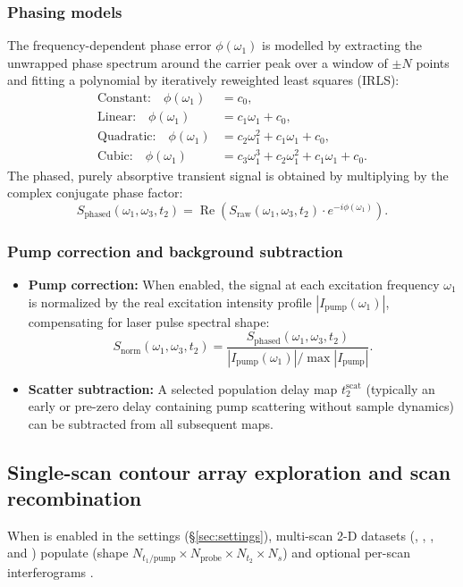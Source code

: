 \subsubsection{Phasing models}
The frequency-dependent phase error $\phi(\omega_1)$ is modelled by extracting the unwrapped phase spectrum around the carrier peak over a window of $\pm N$ points and fitting a polynomial by iteratively reweighted least squares (IRLS):
\begin{align}
  \text{Constant:}  \quad \phi(\omega_1) &= c_0, \\
  \text{Linear:}    \quad \phi(\omega_1) &= c_1 \omega_1 + c_0, \\
  \text{Quadratic:} \quad \phi(\omega_1) &= c_2 \omega_1^2 + c_1 \omega_1 + c_0, \\
  \text{Cubic:}     \quad \phi(\omega_1) &= c_3 \omega_1^3 + c_2 \omega_1^2 + c_1 \omega_1 + c_0.
\end{align}
The phased, purely absorptive transient signal is obtained by multiplying by the complex conjugate phase factor:
\begin{equation}
  S_{\text{phased}}(\omega_1, \omega_3, t_2) = \operatorname{Re}\left( S_{\text{raw}}(\omega_1, \omega_3, t_2) \cdot e^{-i \phi(\omega_1)} \right).
\end{equation}

\subsubsection{Pump correction and background subtraction}
\begin{itemize}
  \item \textbf{Pump correction:} When enabled, the signal at each excitation frequency $\omega_1$ is normalized by the real excitation intensity profile $|I_{\text{pump}}(\omega_1)|$, compensating for laser pulse spectral shape:
    \begin{equation}
      S_{\text{norm}}(\omega_1, \omega_3, t_2) = \frac{S_{\text{phased}}(\omega_1, \omega_3, t_2)}{|I_{\text{pump}}(\omega_1)| / \max |I_{\text{pump}}|}.
    \end{equation}
  \item \textbf{Scatter subtraction:} A selected population delay map $t_2^{\text{scat}}$ (typically an early or pre-zero delay containing pump scattering without sample dynamics) can be subtracted from all subsequent maps.
\end{itemize}

\subsection{Single-scan contour array exploration and scan recombination}\label{sec:twoD:singlescans}
When  is enabled in the settings (\S\ref{sec:settings}), multi-scan 2-D datasets (, , , and ) populate  (shape $N_{t_1/\text{pump}} \times N_{\text{probe}} \times N_{t_2} \times N_s$) and optional per-scan interferograms .

